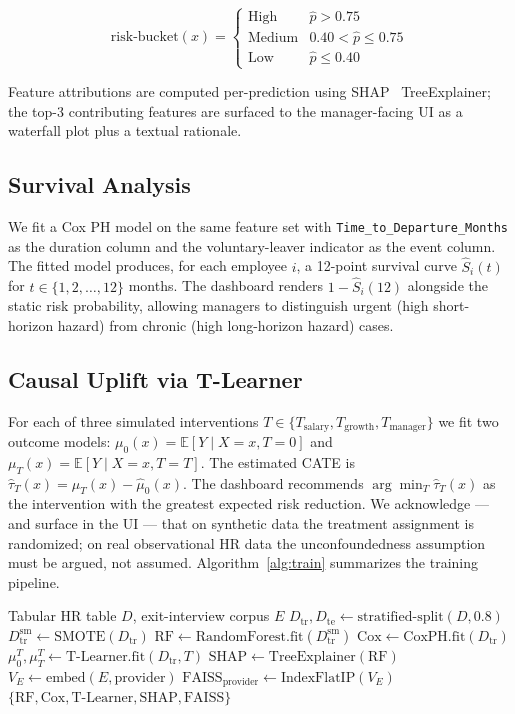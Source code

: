 \documentclass[conference]{IEEEtran}
\begin{document}
$$
\text{risk-bucket}(x) = \begin{cases}
\text{High} & \hat{p} > 0.75 \\
\text{Medium} & 0.40 < \hat{p} \le 0.75 \\
\text{Low} & \hat{p} \le 0.40
\end{cases}
$$

Feature attributions are computed per-prediction using
SHAP~\cite{lundberg2017} TreeExplainer; the top-3 contributing
features are surfaced to the manager-facing UI as a waterfall plot
plus a textual rationale.

\subsection{Survival Analysis}
We fit a Cox PH model on the same feature set with
\texttt{Time\_to\_Departure\_Months} as the duration column and the
voluntary-leaver indicator as the event column. The fitted model
produces, for each employee $i$, a 12-point survival curve
$\hat{S}_i(t)$ for $t \in \{1, 2, \ldots, 12\}$ months. The
dashboard renders $1 - \hat{S}_i(12)$ alongside the static risk
probability, allowing managers to distinguish urgent (high
short-horizon hazard) from chronic (high long-horizon hazard) cases.

\subsection{Causal Uplift via T-Learner}
For each of three simulated interventions
$T \in \{T_{\text{salary}}, T_{\text{growth}}, T_{\text{manager}}\}$
we fit two outcome models: $\mu_0(x) = \mathbb{E}[Y \mid X{=}x, T{=}0]$
and $\mu_T(x) = \mathbb{E}[Y \mid X{=}x, T{=}T]$. The estimated CATE
is $\hat{\tau}_T(x) = \hat{\mu}_T(x) - \hat{\mu}_0(x)$. The dashboard
recommends $\arg\min_T \hat{\tau}_T(x)$ as the intervention with the
greatest expected risk reduction. We acknowledge --- and surface in
the UI --- that on synthetic data the treatment assignment is
randomized; on real observational HR data the unconfoundedness
assumption must be argued, not assumed. Algorithm~\ref{alg:train}
summarizes the training pipeline.

\begin{algorithm}[t]
\caption{AttriSense training pipeline}
\label{alg:train}
\begin{algorithmic}[1]
\REQUIRE Tabular HR table $D$, exit-interview corpus $E$
\STATE $D_{\text{tr}}, D_{\text{te}} \gets \text{stratified-split}(D, 0.8)$
\STATE $D_{\text{tr}}^{\text{sm}} \gets \text{SMOTE}(D_{\text{tr}})$
\STATE $\text{RF} \gets \text{RandomForest.fit}(D_{\text{tr}}^{\text{sm}})$
\STATE $\text{Cox} \gets \text{CoxPH.fit}(D_{\text{tr}})$
  \STATE $\mu_0^{T}, \mu_T^{T} \gets \text{T-Learner.fit}(D_{\text{tr}}, T)$
\ENDFOR
\STATE $\text{SHAP} \gets \text{TreeExplainer}(\text{RF})$
\STATE $V_E \gets \text{embed}(E, \text{provider})$
\STATE $\text{FAISS}_{\text{provider}} \gets \text{IndexFlatIP}(V_E)$
\RETURN $\{\text{RF}, \text{Cox}, \text{T-Learner}, \text{SHAP}, \text{FAISS}\}$
\end{algorithmic}
\end{algorithm}
\end{document}
